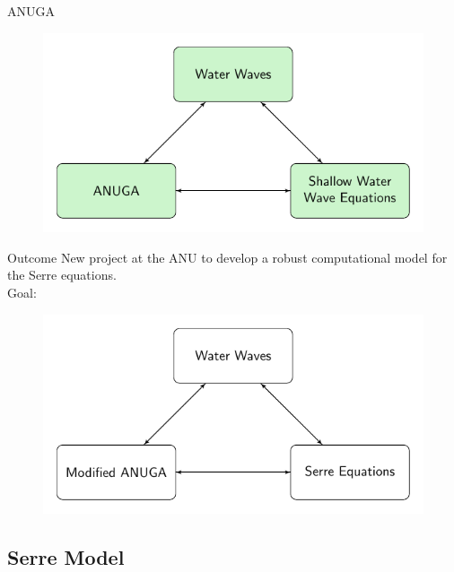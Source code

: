 \documentclass[]{beamer}
\begin{document}
\begin{frame}{ANUGA}
	\begin{figure}
		\includegraphics[width=\textwidth]{./Pics/ModelDiagrams/FlowChartANUGA123G.pdf}
	\end{figure}
\end{frame}


\begin{frame}{Outcome}
 New project at the ANU to develop a robust computational model for the Serre equations. \\
 
  \medskip
 \pause
 Goal:
 	\begin{figure}
 		\includegraphics[width=\textwidth]{./Pics/ModelDiagrams/FlowChartSerre.pdf}
 	\end{figure}
\end{frame}

\subsection{Serre Model}
\end{document}
